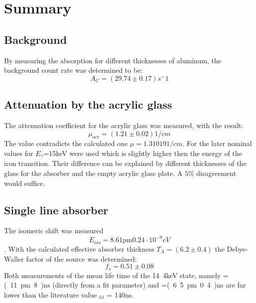 \section{Summary}
\subsection{Background}
By measuring the absorption for different thicknesses of aluminum, the background count rate was determined to be:
\begin{equation*}
A_C= (29.74\pm0.17)s^-1
\end{equation*}	
\subsection{Attenuation by the acrylic glass}
The attenuation coefficient for the acrylic glass was measured, with the result:
\begin{equation*}
\mu_{acr}=\unit{(1.21\pm0.02)}{1/cm}
\end{equation*}
The value contradicts the calculated one $\mu=\unit{1.31019}{1/cm}$. For the later nominal values for $E_\gamma$=\unit{15}{keV} were used which is slightly higher then the energy of the iron transition. Their difference can be explained by different thicknesses of the glass for the absorber and the empty acrylic glass plate. A $5\%$ disagreement would suffice.
\subsection{Single line absorber}
The isomeric shift was measured
\begin{equation*}
E_{iso}= \unit{8.61\pm0.24\cdot10^{-9}}{eV}
\end{equation*}. 
With the calculated effective absorber thickness $T_A=(6.2\pm0.4)$ the Debye-Waller factor of the source was determined:
\begin{equation*}
f_s=0.51\pm0.08
\end{equation*}
Both measurements of the mean life time of the \unit{14.4}{keV} state, namely \scalebox{1.5}{$\tau$}=\unit{(11\pm8)}{ns} (directly from a fit parameter) and \scalebox{1.5}{$\tau$}=\unit{(6.5\pm0.4)}{ns} are far lower than the literature value \scalebox{1.5}{$\tau$}$_{lit}$ = \unit{140}{ns}.

